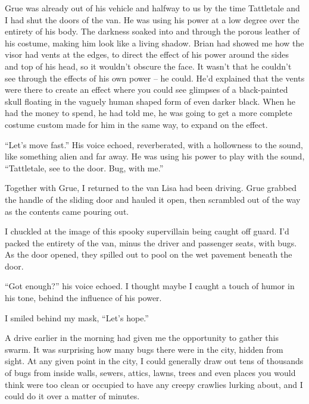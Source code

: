





Grue was already out of his vehicle and halfway to us by the time Tattletale and I had shut the doors of the van.  He was using his power at a low degree over the entirety of his body.  The darkness soaked into and through the porous leather of his costume, making him look like a living shadow.  Brian had showed me how the visor had vents at the edges, to direct the effect of his power around the sides and top of his head, so it wouldn't obscure the face.  It wasn't that he couldn't see through the effects of his own power – he could.  He'd explained that the vents were there to create an effect where you could see glimpses of a black-painted skull floating in the vaguely human shaped form of even darker black.  When he had the money to spend, he had told me, he was going to get a more complete costume custom made for him in the same way, to expand on the effect.



``Let's move fast.''  His voice echoed, reverberated, with a hollowness to the sound, like something alien and far away.  He was using his power to play with the sound, ``Tattletale, see to the door.  Bug, with me.''



Together with Grue, I returned to the van Lisa had been driving.  Grue grabbed the handle of the sliding door and hauled it open, then scrambled out of the way as the contents came pouring out.



I chuckled at the image of this spooky supervillain being caught off guard.  I'd packed the entirety of the van, minus the driver and passenger seats, with bugs.  As the door opened, they spilled out to pool on the wet pavement beneath the door.



``Got enough?'' his voice echoed.  I thought maybe I caught a touch of humor in his tone, behind the influence of his power.



I smiled behind my mask, ``Let's hope.''



A drive earlier in the morning had given me the opportunity to gather this swarm.   It was surprising how many bugs there were in the city, hidden from sight.  At any given point in the city, I could generally draw out tens of thousands of bugs from inside walls, sewers, attics, lawns, trees and even places you would think were too clean or occupied to have any creepy crawlies lurking about, and I could do it over a matter of minutes.



